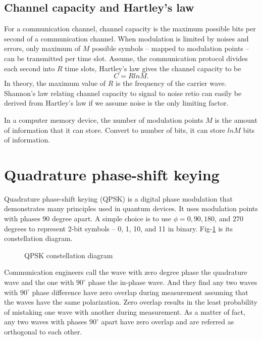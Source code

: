 \documentclass[Letter,11pt]{book}
\begin{document}
\subsection{Channel capacity and Hartley's law}
For a communication channel, channel capacity is the maximum possible bits per second of a communication channel. When modulation is limited by noises and errors, only maximum of $M$ possible symbols -- mapped to modulation points -- can be transmitted per time slot. Assume, the communication protocol divides each second into $R$ time slots, Hartley's law gives the channel capacity to be
\begin{equation}
    C = R ln M.
\end{equation}
In theory, the maximum value of $R$ is the frequency of the carrier wave. Shannon's law relating channel capacity to signal to noise retio can easily be derived from Hartley's law if we assume noise is the only limiting factor.

In a computer memory device, the number of modulation points $M$ is the amount of information that it can store. Convert to number of bits, it can store $ln M$ bits of information.

\section{Quadrature phase-shift keying}
Quadrature phase-shift keying (QPSK) is a digital phase modulation that demonstrates many principles used in quantum devices. It uses modulation points with phases 90 degree apart. A simple choice is to use $\phi = 0, 90, 180$, and $270$ degrees to represent 2-bit symbols -- 0, 1, 10, and 11 in binary. Fig-\ref{QPSK} is its constellation diagram.

\begin{figure}[ht]\label{QPSK}

\caption{QPSK constellation diagram}
\end{figure}

Communication engineers call the wave with zero degree phase the quadrature wave and the one with $90^\circ$ phase the in-phase wave. And they find any two waves with $90^\circ$ phase difference have zero overlap during measurement assuming that the waves have the same polarization. Zero overlap results in the least probability of mistaking one wave with another during measurement. As a matter of fact, any two waves with phases $90^\circ$ apart have zero overlap and are referred as orthogonal to each other.
\end{document}
